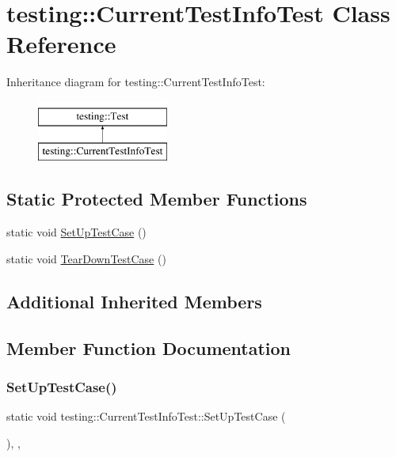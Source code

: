 \hypertarget{classtesting_1_1CurrentTestInfoTest}{}\section{testing\+::Current\+Test\+Info\+Test Class Reference}
\label{classtesting_1_1CurrentTestInfoTest}
Inheritance diagram for testing\+::Current\+Test\+Info\+Test\+:\begin{figure}[H]
\begin{center}
\leavevmode
\includegraphics[height=2.000000cm]{classtesting_1_1CurrentTestInfoTest}
\end{center}
\end{figure}
\subsection*{Static Protected Member Functions}
\begin{DoxyCompactItemize}
\item 
static void \mbox{\hyperlink{classtesting_1_1CurrentTestInfoTest_a61bad7ce29923afd464daf9684b6269e}{Set\+Up\+Test\+Case}} ()
\item 
static void \mbox{\hyperlink{classtesting_1_1CurrentTestInfoTest_a9a80a5a3e6e70c619870c2ae9df892a6}{Tear\+Down\+Test\+Case}} ()
\end{DoxyCompactItemize}
\subsection*{Additional Inherited Members}


\subsection{Member Function Documentation}
\mbox{\label{classtesting_1_1CurrentTestInfoTest_a61bad7ce29923afd464daf9684b6269e}} 
\subsubsection{\texorpdfstring{SetUpTestCase()}{SetUpTestCase()}}
{\footnotesize\ttfamily static void testing\+::\+Current\+Test\+Info\+Test\+::\+Set\+Up\+Test\+Case (\begin{DoxyParamCaption}{ }\end{DoxyParamCaption})\hspace{0.3cm}{\ttfamily [inline]}, {\ttfamily [static]}, {\ttfamily [protected]}}

